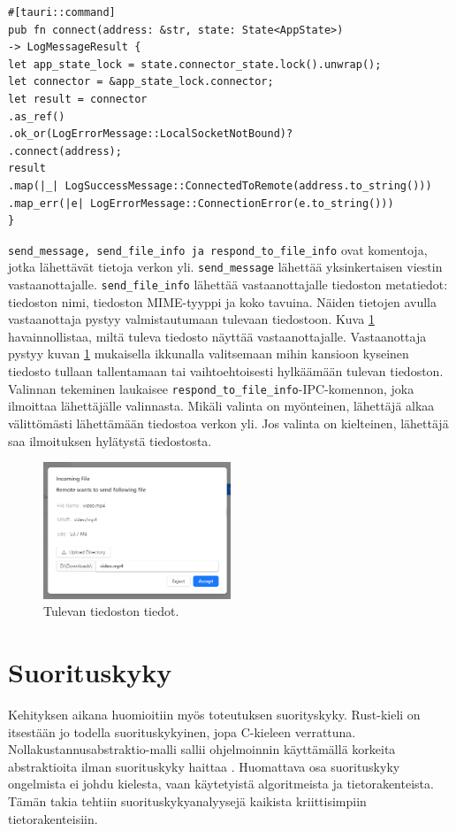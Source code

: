 \documentclass[a4paper,12pt]{article}
\begin{document}
    \begin{lstlisting}[basicstyle=\small\ttfamily,caption={connect-komento.}, label={lst:connect}]
#[tauri::command]
pub fn connect(address: &str, state: State<AppState>)
-> LogMessageResult {
let app_state_lock = state.connector_state.lock().unwrap();
let connector = &app_state_lock.connector;
let result = connector
.as_ref()
.ok_or(LogErrorMessage::LocalSocketNotBound)?
.connect(address);
result
.map(|_| LogSuccessMessage::ConnectedToRemote(address.to_string()))
.map_err(|e| LogErrorMessage::ConnectionError(e.to_string()))
}\end{lstlisting}

    \lstinline{send_message, send_file_info ja respond_to_file_info} ovat komentoja, jotka lähettävät tietoja verkon yli. \lstinline{send_message} lähettää yksinkertaisen viestin vastaanottajalle.
    \lstinline{send_file_info} lähettää vastaanottajalle tiedoston metatiedot: tiedoston nimi, tiedoston MIME-tyyppi ja koko tavuina. Näiden tietojen avulla vastaanottaja pystyy valmistautumaan tulevaan tiedostoon. Kuva \ref{fig:incoming_file} havainnollistaa, miltä tuleva tiedosto näyttää vastaanottajalle. Vastaanottaja pystyy kuvan \ref{fig:incoming_file} mukaisella ikkunalla valitsemaan mihin kansioon kyseinen tiedosto tullaan tallentamaan tai vaihtoehtoisesti hylkäämään tulevan tiedoston. Valinnan tekeminen laukaisee \lstinline{respond_to_file_info}-IPC-komennon, joka ilmoittaa lähettäjälle valinnasta.
    Mikäli valinta on myönteinen, lähettäjä alkaa välittömästi lähettämään tiedostoa verkon yli. Jos valinta on kielteinen, lähettäjä saa ilmoituksen hylätystä tiedostosta.

    \begin{figure}[h!]
        \centering
        \includegraphics[width=0.5\textwidth]{doc/latex/src/images/incoming_file.png}
        \caption{Tulevan tiedoston tiedot.}
        \label{fig:incoming_file}
    \end{figure}

    \section{Suorituskyky}\label{sec:suorityskyky}
    Kehityksen aikana huomioitiin myös toteutuksen suorityskyky. Rust-kieli on itsestään jo todella suorituskykyinen, jopa C-kieleen verrattuna. Nollakustannusabstraktio-malli sallii ohjelmoinnin käyttämällä korkeita abstraktioita ilman suorituskyky haittaa \cite{Codex2023UnderstandingAbstractions}. Huomattava osa suorituskyky ongelmista ei johdu kielesta, vaan käytetyistä algoritmeista ja tietorakenteista. Tämän takia tehtiin suorituskykyanalyysejä kaikista kriittisimpiin tietorakenteisiin.   
\end{document}
